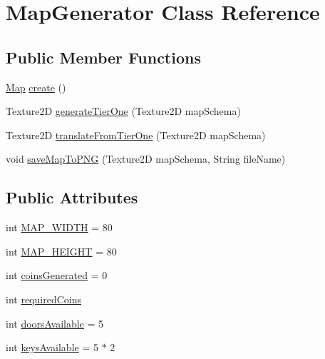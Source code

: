 \hypertarget{class_map_generator}{}\section{Map\+Generator Class Reference}
\label{class_map_generator}
\subsection*{Public Member Functions}
\begin{DoxyCompactItemize}
\item 
\mbox{\hyperlink{class_map}{Map}} \mbox{\hyperlink{class_map_generator_a7c4d8151a385e31bf263f0378a967076}{create}} ()
\item 
Texture2D \mbox{\hyperlink{class_map_generator_aaf73b3dcb37b0693ead016e954541113}{generate\+Tier\+One}} (Texture2D map\+Schema)
\item 
Texture2D \mbox{\hyperlink{class_map_generator_a88f8781269b17a9120e6ffeff03977de}{translate\+From\+Tier\+One}} (Texture2D map\+Schema)
\item 
void \mbox{\hyperlink{class_map_generator_ac9f9a5c3edfe74cbcca1d3fe6d64e84f}{save\+Map\+To\+P\+NG}} (Texture2D map\+Schema, String file\+Name)
\end{DoxyCompactItemize}
\subsection*{Public Attributes}
\begin{DoxyCompactItemize}
\item 
int \mbox{\hyperlink{class_map_generator_a5ad87d4da0ee03ae54fa0b5c46bcb783}{M\+A\+P\+\_\+\+W\+I\+D\+TH}} = 80
\item 
int \mbox{\hyperlink{class_map_generator_af642c2b8ebfb39d3f5d9d74e2f3efe8d}{M\+A\+P\+\_\+\+H\+E\+I\+G\+HT}} = 80
\item 
int \mbox{\hyperlink{class_map_generator_a0c0bb3aed711ace5dcfde868bb4513b5}{coins\+Generated}} = 0
\item 
int \mbox{\hyperlink{class_map_generator_ad8dcd73ee4db42d1f930153ddd350dc9}{required\+Coins}}
\item 
int \mbox{\hyperlink{class_map_generator_a17e2b31cdda98bd4dc9f2583239ec0e9}{doors\+Available}} = 5
\item 
int \mbox{\hyperlink{class_map_generator_ac3d13d204e8d7618890313acc868688f}{keys\+Available}} = 5 $\ast$ 2
\end{DoxyCompactItemize}


